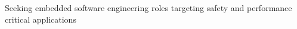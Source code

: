 

\begin{cvparagraph}


Seeking embedded software engineering roles targeting safety and performance critical applications

\end{cvparagraph}
